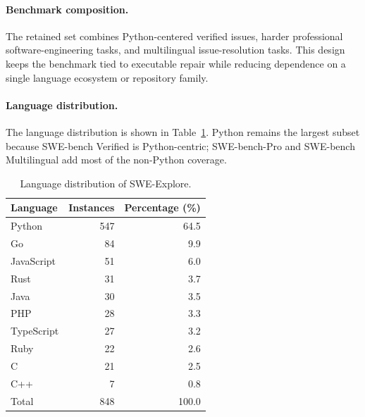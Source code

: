 \documentclass{llmxive}
\begin{document}
\paragraph{Benchmark composition.}
The retained set combines Python-centered verified issues, harder professional
software-engineering tasks, and multilingual issue-resolution tasks. This design
keeps the benchmark tied to executable repair while reducing dependence on a
single language ecosystem or repository family.

\paragraph{Language distribution.}
The language distribution is shown in Table~\ref{tab:language_distribution}.
Python remains the largest subset because SWE-bench Verified is Python-centric;
SWE-bench-Pro and SWE-bench Multilingual add most of the non-Python coverage.

\begin{table}[!htbp]
\centering
\begin{tabular}{lrr}
\toprule
Language & Instances & Percentage (\%) \\
\midrule
Python & 547 & 64.5 \\
Go & 84 & 9.9 \\
JavaScript & 51 & 6.0 \\
Rust & 31 & 3.7 \\
Java & 30 & 3.5 \\
PHP & 28 & 3.3 \\
TypeScript & 27 & 3.2 \\
Ruby & 22 & 2.6 \\
C & 21 & 2.5 \\
C++ & 7 & 0.8 \\
\midrule
Total & 848 & 100.0 \\
\bottomrule
\end{tabular}
\caption{Language distribution of SWE-Explore.}
\label{tab:language_distribution}
\end{table}
\end{document}
